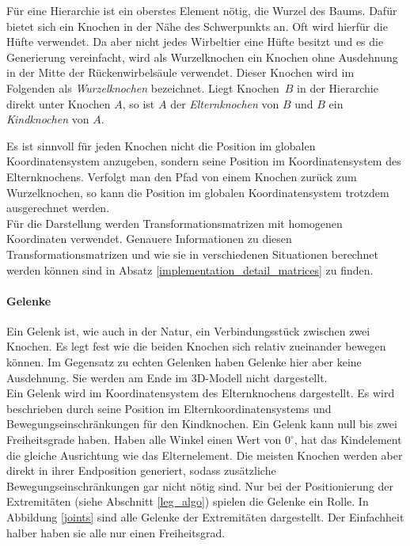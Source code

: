 Für eine Hierarchie ist ein oberstes Element nötig, die Wurzel des Baums.
Dafür bietet sich ein Knochen in der Nähe des Schwerpunkts an. Oft wird hierfür die Hüfte verwendet.
Da aber nicht jedes Wirbeltier eine Hüfte besitzt und es die Generierung vereinfacht, wird als Wurzelknochen ein Knochen ohne Ausdehnung in der Mitte der Rückenwirbelsäule verwendet. Dieser Knochen wird im Folgenden als \emph{Wurzelknochen} bezeichnet. Liegt \mbox{Knochen $B$} in der Hierarchie direkt unter Knochen $A$, so ist $A$ der \emph{Elternknochen} von $B$ und $B$ ein \emph{Kindknochen} von $A$.

Es ist sinnvoll für jeden Knochen nicht die Position im globalen Koordinatensystem anzugeben, sondern seine Position im Koordinatensystem des Elternknochens. Verfolgt man den Pfad von einem Knochen zurück zum Wurzelknochen, so kann die Position im globalen Koordinatensystem trotzdem ausgerechnet werden. \\
Für die Darstellung werden Transformationsmatrizen mit homogenen Koordinaten verwendet. Genauere Informationen zu diesen Transformationsmatrizen und wie sie in verschiedenen Situationen berechnet werden können sind in Absatz \ref{implementation_detail_matrices} zu finden.

\paragraph{Gelenke}
Ein Gelenk ist, wie auch in der Natur, ein Verbindungsstück zwischen zwei Knochen. Es legt fest wie die beiden Knochen sich relativ zueinander bewegen können. Im Gegensatz zu echten Gelenken haben Gelenke hier aber keine Ausdehnung. Sie werden am Ende im 3D-Modell nicht dargestellt.\\
Ein Gelenk wird im Koordinatensystem des Elternknochens dargestellt. Es wird beschrieben durch seine Position im Elternkoordinatensystems und Bewegungseinschränkungen für den Kindknochen. Ein Gelenk kann null bis zwei Freiheitsgrade haben. Haben alle Winkel einen Wert von $0^\circ$, hat das Kindelement die gleiche Ausrichtung wie das Elternelement. 
Die meisten Knochen werden aber direkt in ihrer Endposition generiert, sodass zusätzliche Bewegungseinschränkungen gar nicht nötig sind. Nur bei der Positionierung der Extremitäten (siehe Abschnitt \ref{leg_algo}) spielen die Gelenke ein Rolle.
In Abbildung \ref{joints} sind alle Gelenke der Extremitäten dargestellt. Der Einfachheit halber haben sie alle nur einen Freiheitsgrad.

